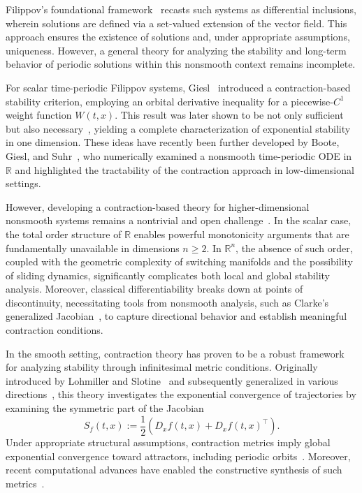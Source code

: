 \documentclass[11pt]{article}
\begin{document}
Filippov's foundational framework~\cite{filippov1988} recasts such systems as differential inclusions, wherein solutions are defined via a set-valued extension of the vector field. This approach ensures the existence of solutions and, under appropriate assumptions, uniqueness. However, a general theory for analyzing the stability and long-term behavior of periodic solutions within this nonsmooth context remains incomplete.

For scalar time-periodic Filippov systems, Giesl~\cite{giesl2005} introduced a contraction-based stability criterion, employing an orbital derivative inequality for a piecewise-$C^1$ weight function $W(t,x)$. This result was later shown to be not only sufficient but also necessary~\cite{giesl2007}, yielding a complete characterization of exponential stability in one dimension. These ideas have recently been further developed by Boote, Giesl, and Suhr~\cite{boote2025}, who numerically examined a nonsmooth time-periodic ODE in $\mathbb{R}$ and highlighted the tractability of the contraction approach in low-dimensional settings.

However, developing a contraction-based theory for higher-dimensional nonsmooth systems remains a nontrivial and open challenge~\cite{boote2025}. In the scalar case, the total order structure of \( \mathbb{R} \) enables powerful monotonicity arguments that are fundamentally unavailable in dimensions \( n \geq 2 \). In \( \mathbb{R}^n \), the absence of such order, coupled with the geometric complexity of switching manifolds and the possibility of sliding dynamics, significantly complicates both local and global stability analysis. Moreover, classical differentiability breaks down at points of discontinuity, necessitating tools from nonsmooth analysis, such as Clarke's generalized Jacobian~\cite{clarke1983}, to capture directional behavior and establish meaningful contraction conditions.

In the smooth setting, contraction theory has proven to be a robust framework for analyzing stability through infinitesimal metric conditions. Originally introduced by Lohmiller and Slotine~\cite{lohmiller2000} and subsequently generalized in various directions~\cite{bullo2023}, this theory investigates the exponential convergence of trajectories by examining the symmetric part of the Jacobian
\[
S_f(t,x) := \frac{1}{2} \left( D_x f(t,x) + D_x f(t,x)^\top \right).
\]
Under appropriate structural assumptions, contraction metrics imply global exponential convergence toward attractors, including periodic orbits~\cite{giesl2023, sontag2010}. Moreover, recent computational advances have enabled the constructive synthesis of such metrics~\cite{giesl2021}.
\end{document}
